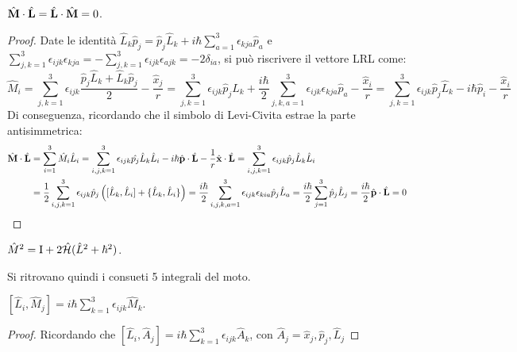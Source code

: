 \begin{proposition}
	$ \hat{\mathbf{M}}\cdot\hat{\mathbf{L}} = \hat{\mathbf{L}}\cdot\hat{\mathbf{M}} = 0 $.
\end{proposition}
\begin{proof}
	Date le identità $ \hat{L}_k \hat{p}_j = \hat{p}_j \hat{L}_k + i\hbar \sum_{a = 1}^{3} \epsilon_{kja} \hat{p}_a $ e $ \sum_{j,k = 1}^{3} \epsilon_{ijk} \epsilon_{kja} = - \sum_{j,k = 1}^{3} \epsilon_{ijk} \epsilon_{ajk} = -2\delta_{ia} $, si può riscrivere il vettore LRL come:
	\begin{equation*}
		\hat{M}_i = \sum_{j,k = 1}^{3} \epsilon_{ijk} \frac{\hat{p}_j \hat{L}_k + \hat{L}_k \hat{p}_j}{2} - \frac{\hat{x}_j}{r} = \sum_{j,k = 1}^{3} \epsilon_{ijk} \hat{p}_j \hat{L}_k + \frac{i\hbar}{2} \sum_{j,k,a = 1}^{3} \epsilon_{ijk} \epsilon_{kja} \hat{p}_a - \frac{\hat{x}_i}{r} = \sum_{j,k = 1}^{3} \epsilon_{ijk} \hat{p}_j \hat{L}_k - i\hbar \hat{p}_i - \frac{\hat{x}_i}{r}
	\end{equation*}
	Di conseguenza, ricordando che il simbolo di Levi-Civita estrae la parte antisimmetrica:
	\begin{equation*}
		\begin{split}
			\hat{\mathbf{M}}\cdot\hat{\mathbf{L}}
			&= \sum_{i = 1}^{3} \hat{M}_i \hat{L}_i = \sum_{i,j,k = 1}^{3} \epsilon_{ijk} \hat{p_j} \hat{L}_k \hat{L}_i - i\hbar \hat{\mathbf{p}} \cdot \hat{\mathbf{L}} - \frac{1}{r} \hat{\mathbf{x}} \cdot \hat{\mathbf{L}} = \sum_{i,j,k = 1}^{3} \epsilon_{ijk} \hat{p}_j \hat{L}_k \hat{L}_i \\
			&= \frac{1}{2} \sum_{i,j,k = 1}^{3} \epsilon_{ijk} \hat{p}_j \left( [\hat{L}_k, \hat{L}_i] + \{\hat{L}_k, \hat{L}_i\} \right) = \frac{i\hbar}{2} \sum_{i,j,k,a = 1}^{3} \epsilon_{ijk} \epsilon_{kia} \hat{p}_j \hat{L}_a = \frac{i\hbar}{2} \sum_{j = 1}^{3} \hat{p}_j \hat{L}_j = \frac{i\hbar}{2} \hat{\mathbf{p}} \cdot \hat{\mathbf{L}} = 0
		\end{split}
	\end{equation*}
\end{proof}

\begin{proposition}\label{lrl-h-l}
	$ \hat{M}^2 = \mathrm{I} + 2\hat{\mathcal{H}} (\hat{L}^2 + \hbar^2) $.
\end{proposition}

Si ritrovano quindi i consueti 5 integrali del moto.

\begin{proposition}\label{comm-l-m}
	$ [\hat{L}_i, \hat{M}_j] = i\hbar \sum_{k = 1}^{3} \epsilon_{ijk} \hat{M}_k $.
\end{proposition}
\begin{proof}
	Ricordando che $ [\hat{L}_i, \hat{A}_j] = i\hbar \sum_{k = 1}^{3} \epsilon_{ijk} \hat{A}_k $, con $ \hat{A}_j = \hat{x}_j, \hat{p}_j, \hat{L}_j $
\end{proof}

